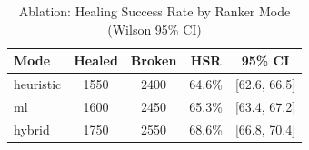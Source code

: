 \begin{table}[h]
\centering
\caption{Ablation: Healing Success Rate by Ranker Mode (Wilson 95\% CI)}
\label{tab:mode_comparison}
\begin{tabular}{lcccc}
\toprule
Mode & Healed & Broken & HSR & 95\% CI \\
\midrule
heuristic & 1550 & 2400 & 64.6\% & [62.6, 66.5] \\
ml & 1600 & 2450 & 65.3\% & [63.4, 67.2] \\
hybrid & 1750 & 2550 & 68.6\% & [66.8, 70.4] \\
\bottomrule
\end{tabular}
\end{table}